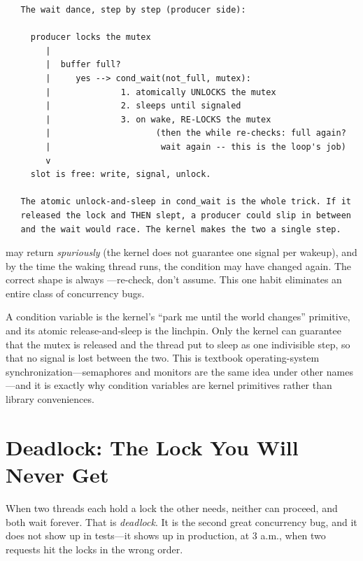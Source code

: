 \begin{verbatim}
   The wait dance, step by step (producer side):

     producer locks the mutex
        |
        |  buffer full?
        |     yes --> cond_wait(not_full, mutex):
        |              1. atomically UNLOCKS the mutex
        |              2. sleeps until signaled
        |              3. on wake, RE-LOCKS the mutex
        |                     (then the while re-checks: full again?
        |                      wait again -- this is the loop's job)
        v
     slot is free: write, signal, unlock.

   The atomic unlock-and-sleep in cond_wait is the whole trick. If it
   released the lock and THEN slept, a producer could slip in between
   and the wait would race. The kernel makes the two a single step.
\end{verbatim}

\begin{ruleofthumb}
 may return \emph{spuriously} (the kernel
does not guarantee one signal per wakeup), and by the time the waking
thread runs, the condition may have changed again. The correct shape
is always ---re-check, don't
assume. This one habit eliminates an entire class of concurrency bugs.
\end{ruleofthumb}

\begin{osconcept}
A condition variable is the kernel's ``park me until the world
changes'' primitive, and its atomic release-and-sleep is the 
linchpin. Only the kernel can guarantee that the mutex is released
and the thread put to sleep as one indivisible step, so that no
signal is lost between the two. This is textbook operating-system
synchronization---semaphores and monitors are the same idea under
other names---and it is exactly why condition variables are kernel
primitives rather than library conveniences.
\end{osconcept}

\section{Deadlock: The Lock You Will Never Get}

When two threads each hold a lock the other needs, neither can
proceed, and both wait forever. That is \emph{deadlock}. It is the
second great concurrency bug, and it does not show up in tests---it
shows up in production, at 3 a.m., when two requests hit the locks in
the wrong order.

